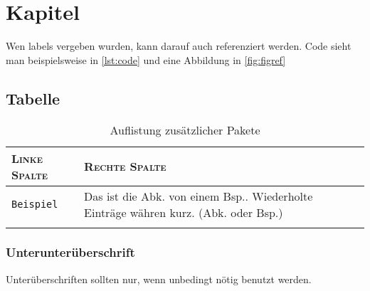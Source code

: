 \section{Kapitel}\label{sec:kapitel}
Wen labels vergeben wurden, kann darauf auch referenziert werden. Code sieht man beispielsweise in \autoref{lst:code} und eine Abbildung in \autoref{fig:figref}

\subsection{Tabelle}
\begin{longtable}{p{}|p{}}
	\toprule
	{\large\textsc{Linke Spalte}} & {\large\textsc{Rechte Spalte}} \\
	\midrule[1pt]
	\texttt{Beispiel\autocite{example}} & Das ist die \ac{Abk.} von einem \ac{Bsp.}. Wiederholte Einträge währen kurz. (\ac{Abk.} oder \ac{Bsp.}) \\
	\bottomrule
	\caption{Auflistung zusätzlicher Pakete}
	\label{tab:software}
\end{longtable}

\subsubsection{Unterunterüberschrift}\label{subsubsec:label}
Unterüberschriften sollten nur, wenn unbedingt nötig benutzt werden.
